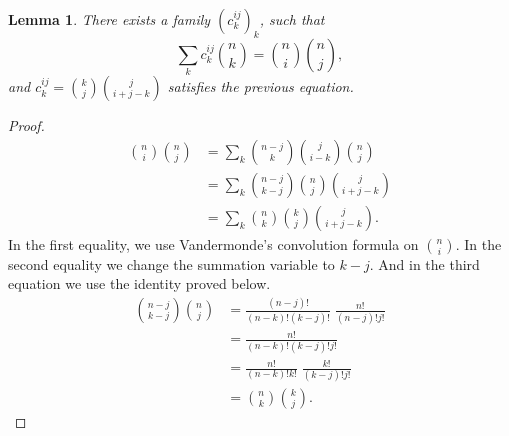 \documentclass[nocopyrightspace,preprint]{sigplanconf-pldi15}
\newtheorem{lemma}{Lemma}
\begin{document}
\begin{lemma}
  There exists a family $(c^{ij}_k)_k$, such that
  $$
  \sum_k c^{ij}_k \binom n k = \binom n i \binom n j,
  $$
  and $c^{ij}_k = \binom k j \binom j {i+j - k}$ satisfies
  the previous equation.
\end{lemma}
\begin{proof}
  \begin{align*}
    \binom n i \binom n j
      &= \sum_k \binom {n-j} k \binom j {i-k} \binom n j \\
      &= \sum_k \binom {n-j} {k-j} \binom n j \binom j {i+j-k} \\
      &= \sum_k \binom n k \binom k j \binom j {i+j-k}.
  \end{align*}
  In the first equality, we use Vandermonde's convolution
  formula on $\binom n i$.  In the second equality we change
  the summation variable to $k-j$.  And in the third equation
  we use the identity proved below.
  \begin{align*}
    \binom {n-j} {k-j} \binom n j
      &= \frac {(n-j)!} {(n-k)! (k-j)!} \; \frac {n!} {(n-j)! j!} \\
      &= \frac {n!} {(n-k)! (k-j)! j!} \\
      &= \frac {n!} {(n-k)! k!} \; \frac {k!} {(k-j)! j!} \\
      &= \binom n k \binom k j.
  \end{align*}
\end{proof}



\end{document}
